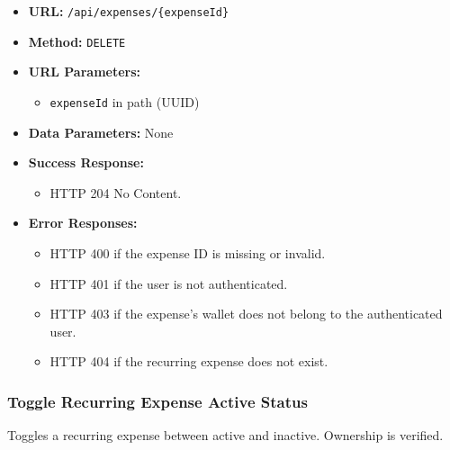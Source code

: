 \begin{itemize}
    \item \textbf{URL:} \texttt{/api/expenses/\{expenseId\}}
    \item \textbf{Method:} \texttt{DELETE}
    \item \textbf{URL Parameters:}
    \begin{itemize}
        \item \texttt{expenseId} in path (UUID)
    \end{itemize}
    \item \textbf{Data Parameters:} None
    \item \textbf{Success Response:}
    \begin{itemize}
        \item HTTP 204 No Content.
    \end{itemize}
    \item \textbf{Error Responses:}
    \begin{itemize}
        \item HTTP 400 if the expense ID is missing or invalid.
        \item HTTP 401 if the user is not authenticated.
        \item HTTP 403 if the expense's wallet does not belong to the authenticated user.
        \item HTTP 404 if the recurring expense does not exist.
    \end{itemize}
\end{itemize}

\subsubsection{Toggle Recurring Expense Active Status}

Toggles a recurring expense between active and inactive. Ownership is verified.

